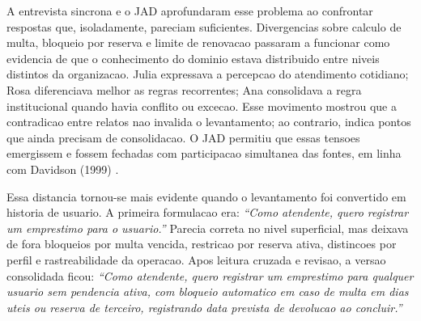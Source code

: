 ﻿\documentclass[12pt]{article}
\begin{document}
%
A entrevista sincrona e o JAD aprofundaram esse problema ao confrontar respostas que, isoladamente, pareciam suficientes. Divergencias sobre calculo de multa, bloqueio por reserva e limite de renovacao passaram a funcionar como evidencia de que o conhecimento do dominio estava distribuido entre niveis distintos da organizacao. Julia expressava a percepcao do atendimento cotidiano; Rosa diferenciava melhor as regras recorrentes; Ana consolidava a regra institucional quando havia conflito ou excecao. Esse movimento mostrou que a contradicao entre relatos nao invalida o levantamento; ao contrario, indica pontos que ainda precisam de consolidacao. O JAD permitiu que essas tensoes emergissem e fossem fechadas com participacao simultanea das fontes, em linha com Davidson (1999) \cite{davidson1999jad}.

%
Essa distancia tornou-se mais evidente quando o levantamento foi convertido em historia de usuario. A primeira formulacao era: \textit{``Como atendente, quero registrar um emprestimo para o usuario.''} Parecia correta no nivel superficial, mas deixava de fora bloqueios por multa vencida, restricao por reserva ativa, distincoes por perfil e rastreabilidade da operacao. Apos leitura cruzada e revisao, a versao consolidada ficou: \textit{``Como atendente, quero registrar um emprestimo para qualquer usuario sem pendencia ativa, com bloqueio automatico em caso de multa em dias uteis ou reserva de terceiro, registrando data prevista de devolucao ao concluir.''}
\end{document}
